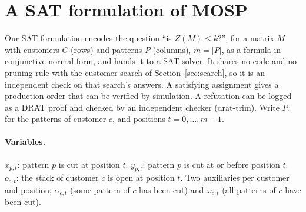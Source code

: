 \section{A SAT formulation of MOSP}
\label{app:sat}

Our SAT formulation encodes the question ``is $Z(M)\le k$?'', for a matrix $M$
with customers $C$ (rows) and patterns $P$ (columns), $m=|P|$, as a formula
in conjunctive normal form, and hands it to a SAT solver. It shares no code and
no pruning rule with the customer search of Section~\ref{sec:search}, so it is
an independent check on that search's answers. A satisfying assignment gives a
production order that can be verified by simulation. A refutation can be
logged as a DRAT proof and checked by an independent checker (drat-trim).
Write $P_c$ for the patterns of customer $c$, and positions
$t=0,\dots,m-1$.

\paragraph{Variables.} $x_{p,t}$: pattern $p$ is cut at position $t$.
$y_{p,t}$: pattern $p$ is cut at or before position $t$. $o_{c,t}$: the stack of
customer $c$ is open at position $t$. Two auxiliaries per customer and
position, $\alpha_{c,t}$ (some pattern of $c$ has been cut) and
$\omega_{c,t}$ (all patterns of $c$ have been cut).

